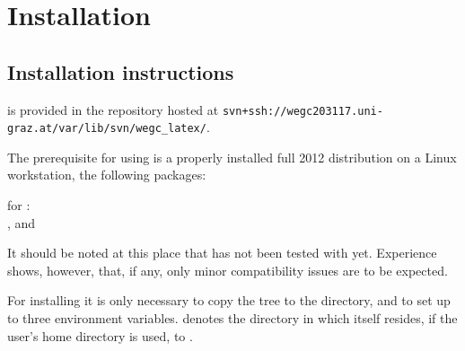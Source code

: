 

\section{Installation}
\label{sec:installation}


\subsection{Installation instructions}
\label{sec:installationInstructions}

\wegcLaTeX{} is provided in the repository hosted at
\nolinkurl{svn+ssh://wegc203117.uni-graz.at/var/lib/svn/wegc_latex/}.

The prerequisite for using \wegcLaTeX{} is a properly installed full \TeXLive{} 2012 distribution on a Linux workstation,
\IE{} the following packages:
\begin{description}
   \item for : \\
      , and 
\end{description}

It should be noted at this place that \wegcLaTeX{} has not been tested with
\MiKTeX{} yet. Experience shows, however, that, if any, only minor
compatibility issues are to be expected.

For installing \wegcLaTeX{} it is only necessary to copy the \wegcLaTeX{}
\texmf{} tree to the  directory, and to set up
to three environment variables.  denotes the
directory in which  itself resides, \EG{} if the user's home
directory is used, to .

